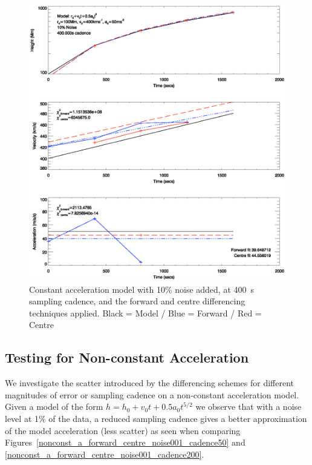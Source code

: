 \documentclass[namedreferences]{SolarPhysics}
\begin{document}
\begin{article}
\begin{figure}
 \centerline{\includegraphics[width=\linewidth]{images/const_a_forward_centre_noise010_cadence400.ps}}
   \caption{Constant acceleration model with 10\% noise added, at 400~s sampling cadence, and the forward and centre differencing techniques applied. Black = Model / Blue = Forward / Red = Centre}
    \label{const_a_forward_centre_noise010_cadence400}
\end{figure}

\subsection{Testing for Non-constant Acceleration}

We investigate the scatter introduced by the differencing schemes for different magnitudes of error or sampling cadence on a non-constant acceleration model. Given a model of the form $h=h_0+v_0t+0.5a_0t^{5/2}$ we observe that with a noise level at 1\% of the data, a reduced sampling cadence gives a better approximation of the model acceleration (less scatter) as seen when comparing Figures~\ref{nonconst_a_forward_centre_noise001_cadence50} and \ref{nonconst_a_forward_centre_noise001_cadence200}.



\end{article}
\end{document}
